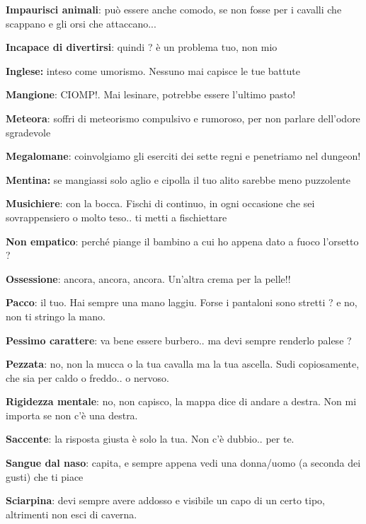 \documentclass[a4paper,11pt,twoside,openany]{book}
\begin{document}
\textbf{Impaurisci animali}: può essere anche comodo, se non fosse per i cavalli che scappano e gli orsi che attaccano...

\textbf{Incapace di divertirsi}: quindi ? è un problema tuo, non mio

\textbf{Inglese:} inteso come umorismo. Nessuno mai capisce le tue battute

\textbf{Mangione}: CIOMP!. Mai lesinare, potrebbe essere l'ultimo pasto!

\textbf{Meteora}: soffri di meteorismo compulsivo e rumoroso, per non parlare dell'odore sgradevole

\textbf{Megalomane}: coinvolgiamo gli eserciti dei sette regni e penetriamo nel dungeon!

\textbf{Mentina:} se mangiassi solo aglio e cipolla il tuo alito sarebbe meno puzzolente

\textbf{Musichiere}: con la bocca. Fischi di continuo, in ogni occasione che sei sovrappensiero o molto teso.. ti metti a fischiettare

\textbf{Non empatico}: perché piange il bambino a cui ho appena dato a fuoco l'orsetto ?

\textbf{Ossessione}: ancora, ancora, ancora. Un'altra crema per la pelle!!

\textbf{Pacco}: il tuo. Hai sempre una mano laggiu. Forse i pantaloni sono stretti ? e no, non ti stringo la mano.

\textbf{Pessimo carattere}: va bene essere burbero.. ma devi sempre renderlo palese ?

\textbf{Pezzata}: no, non la mucca o la tua cavalla ma la tua ascella. Sudi copiosamente, che sia per caldo o freddo.. o nervoso.

\textbf{Rigidezza mentale}: no, non capisco, la mappa dice di andare a destra. Non mi importa se non c'è una destra.

\textbf{Saccente}: la risposta giusta è solo la tua. Non c'è dubbio.. per te.

\textbf{Sangue dal naso}: capita, e sempre appena vedi una donna/uomo (a seconda dei gusti) che ti piace

\textbf{Sciarpina}: devi sempre avere addosso e visibile un capo di un certo tipo, altrimenti non esci di caverna.
\end{document}
